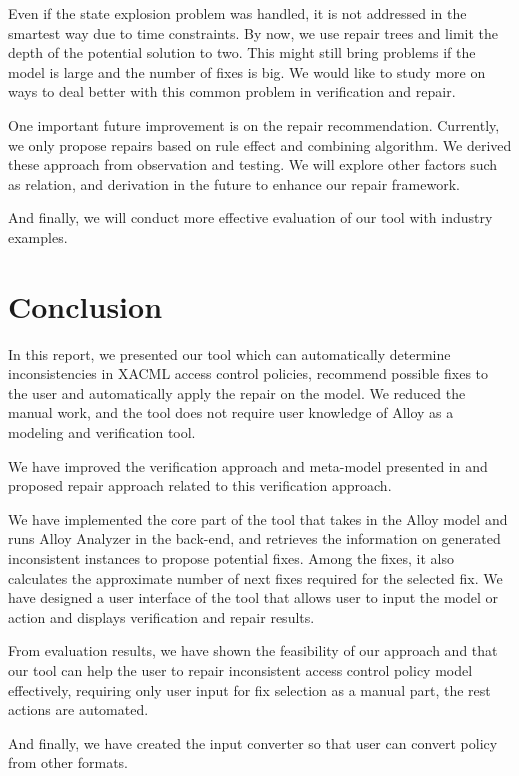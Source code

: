\documentclass{acm_proc_article-sp}
\begin{document}
Even if the state explosion problem was handled, it is not addressed in the smartest way due to time constraints. By now, we use repair trees and limit the depth of the potential solution to two. This might still bring problems if the model is large and the number of fixes is big. We would like to study more on ways to deal better with this common problem in verification and repair.

One important future improvement is on the repair recommendation. Currently, we only propose repairs based on rule effect and combining algorithm. We derived these approach from observation and testing. We will explore other factors such as relation, and derivation in the future to enhance our repair framework.

And finally, we will conduct more effective evaluation of our tool with industry examples.

\section{Conclusion}

In this report, we presented our tool which can automatically determine inconsistencies in XACML access control policies, recommend possible fixes to the user and automatically apply the repair on the model. We reduced the manual work, and the tool does not require user knowledge of Alloy as a modeling and verification tool.

We have improved the verification approach and meta-model presented in \cite{acp:alloy} and proposed repair approach related to this verification approach.

We have implemented the core part of the tool that takes in the Alloy model and runs Alloy Analyzer in the back-end, and retrieves the information on generated inconsistent instances to propose potential fixes. Among the fixes, it also calculates the approximate number of next fixes required for the selected fix. 
We have designed a user interface of the tool that allows user to input the model or action and displays verification and repair results. 

From evaluation results, we have shown the feasibility of our approach and that our tool can help the user to repair inconsistent access control policy model effectively, requiring only user input for fix selection as a manual part, the rest actions are automated. 

And finally, we have created the input converter so that user can convert policy from other formats. 
\end{document}
